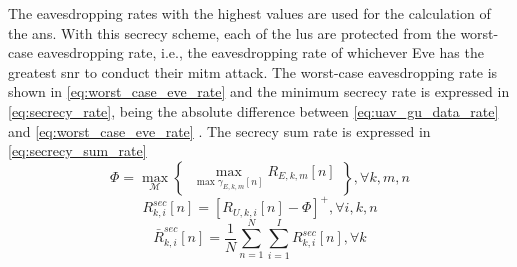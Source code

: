 The eavesdropping rates with the highest values are used for the calculation of the \acrshort{ans}. 
With this secrecy scheme, each of the \acrshort{lu}s are protected from the worst-case eavesdropping rate, i.e., the eavesdropping rate of whichever Eve has the greatest \acrshort{snr} to conduct their \acrshort{mitm} attack. 
The worst-case eavesdropping rate is shown in \ref{eq:worst_case_eve_rate} and the minimum secrecy rate is expressed in \ref{eq:secrecy_rate}, being the absolute difference between \ref{eq:uav_gu_data_rate} and \ref{eq:worst_case_eve_rate} \cite{zhang_one_2025}. 
The secrecy sum rate is expressed in \ref{eq:secrecy_sum_rate}
\begin{equation}\label{eq:worst_case_eve_rate}
    \Phi = \underset{\mathcal{M}}{\max}\begin{Bmatrix} \underset{\max \gamma_{E, k, m}[n]}{\max} 
        R_{E, k, m}[n]
    \end{Bmatrix}, \forall k, m, n
\end{equation} 
\begin{equation} \label{eq:secrecy_rate}
    R_{k, i}^{sec} [n] = [R_{U, k, i} [n] - \Phi]^{+}, \forall i, k, n
\end{equation} 
\begin{equation} \label{eq:secrecy_sum_rate}
    \bar{R}_{k, i}^{sec} [n] = \frac{1}{N} \sum_{n=1}^{N} \sum_{i=1}^{I} R_{k, i}^{sec} [n], \forall k
\end{equation}

